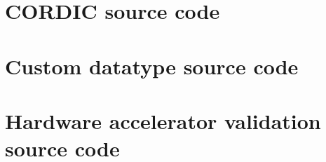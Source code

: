 \documentclass[11pt]{report}
\begin{document}
\begin{appendices}
    \chapter{CORDIC source code}
        \begin{singlespace}
            
        \end{singlespace}   
        
        \begin{singlespace}
            
        \end{singlespace}
       
     \chapter{Custom datatype source code}
        \begin{singlespace}
            
        \end{singlespace}    
        
      \chapter{Hardware accelerator validation source code}
        \begin{singlespace}
            
        \end{singlespace}  

\end{appendices}
\end{document}
